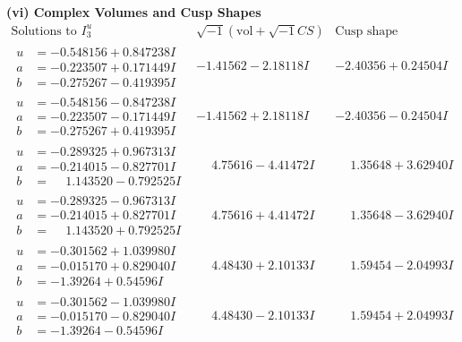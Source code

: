 \documentclass[1p]{elsarticle_modified}
\theoremstyle{definition}
\newcommand{\I}{\sqrt{-1}}
\begin{document}
\newpage\flushleft \textbf{(vi) Complex Volumes and Cusp Shapes}
$$\begin{array}{c|c|c}  
\text{Solutions to }I^u_{3}& \I (\text{vol} + \sqrt{-1}CS) & \text{Cusp shape}\\
 \hline 
\begin{aligned}
u &= -0.548156 + 0.847238 I \\
a &= -0.223507 + 0.171449 I \\
b &= -0.275267 - 0.419395 I\end{aligned}
 & -1.41562 - 2.18118 I & -2.40356 + 0.24504 I \\ \hline\begin{aligned}
u &= -0.548156 - 0.847238 I \\
a &= -0.223507 - 0.171449 I \\
b &= -0.275267 + 0.419395 I\end{aligned}
 & -1.41562 + 2.18118 I & -2.40356 - 0.24504 I \\ \hline\begin{aligned}
u &= -0.289325 + 0.967313 I \\
a &= -0.214015 - 0.827701 I \\
b &= \phantom{-}1.143520 - 0.792525 I\end{aligned}
 & \phantom{-}4.75616 - 4.41472 I & \phantom{-}1.35648 + 3.62940 I \\ \hline\begin{aligned}
u &= -0.289325 - 0.967313 I \\
a &= -0.214015 + 0.827701 I \\
b &= \phantom{-}1.143520 + 0.792525 I\end{aligned}
 & \phantom{-}4.75616 + 4.41472 I & \phantom{-}1.35648 - 3.62940 I \\ \hline\begin{aligned}
u &= -0.301562 + 1.039980 I \\
a &= -0.015170 + 0.829040 I \\
b &= -1.39264 + 0.54596 I\end{aligned}
 & \phantom{-}4.48430 + 2.10133 I & \phantom{-}1.59454 - 2.04993 I \\ \hline\begin{aligned}
u &= -0.301562 - 1.039980 I \\
a &= -0.015170 - 0.829040 I \\
b &= -1.39264 - 0.54596 I\end{aligned}
 & \phantom{-}4.48430 - 2.10133 I & \phantom{-}1.59454 + 2.04993 I \\ \hline\begin{aligned}

\end{aligned}
\end{array}$$
\end{document}
